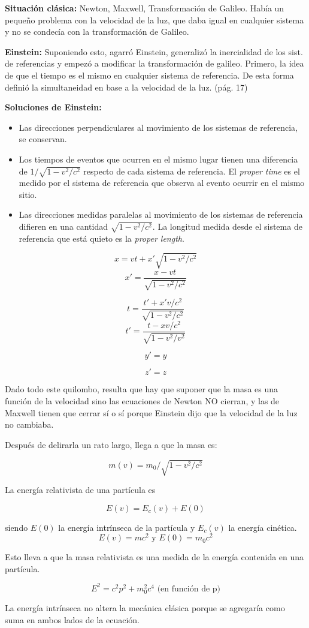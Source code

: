 \documentclass{article}
\begin{document}
\textbf{Situación clásica:}
Newton, Maxwell, Transformación de Galileo. Había un pequeño problema con la velocidad de la luz, que daba igual en cualquier sistema y no se condecía con la transformación de Galileo.

\textbf{Einstein:}
Suponiendo esto, agarró Einstein, generalizó la inercialidad de los sist. de referencias y empezó a modificar la transformación de galileo.
Primero, la idea de que el tiempo es el mismo en cualquier sistema de referencia. De esta forma definió la simultaneidad en base a la velocidad de la luz. (pág. 17)

\textbf{Soluciones de Einstein:}
\begin{itemize}
\item Las direcciones perpendiculares al movimiento de los sistemas de referencia, se conservan.
\item Los tiempos de eventos que ocurren en el mismo lugar tienen una diferencia de $1/\sqrt{1-v^{2}/c^{2}}$ respecto de cada sistema de referencia. El \emph{proper time} es el medido por el sistema de referencia que observa al evento ocurrir en el mismo sitio.
\item Las direcciones medidas paralelas al movimiento de los sistemas de referencia difieren en una cantidad $\sqrt{1-v^{2}/c^{2}}$. La longitud medida desde el sistema de referencia que está quieto es la \emph{proper length}.
\end{itemize}

\[ x = vt + x' \sqrt{1-v^{2}/c^{2}} \]
\[ x' = \frac{x-vt}{\sqrt{1-v^{2}/c^{2}}} \]

\[ t =  \frac{t'+x' v/c^{2}}{\sqrt{1-v^{2}/c^{2}}} \]
\[ t' = \frac{t-xv/c^{2}}{\sqrt{1-v^{2}/v^{2}}} \]

\[ y' =y \] 

\[ z' =z \]

Dado todo este quilombo, resulta que hay que suponer que la masa es una función de la velocidad sino las ecuaciones de Newton NO cierran, y las de Maxwell tienen que cerrar sí o sí porque Einstein dijo que la velocidad de la luz no cambiaba.

Después de delirarla un rato largo, llega a que la masa es:

\[ m(v) = m_{0}/\sqrt{1-v^{2}/c^{2}} \]

La energía relativista de una partícula es

\[ E(v) = E_{c} (v) + E (0) \]

siendo $E(0)$ la energía intrínseca de la partícula y $E_{c}(v)$ la energía cinética.
\[ E(v) = mc^{2} \textrm{ y } E(0) = m_{0}c^{2} \]

Esto lleva a que la masa relativista es una medida de la energía contenida en una partícula.

\[ E^{2} = c^{2}p^{2} + m_{0}^{2}c^{4} \textrm{ (en función de p)} \]

La energía intrínseca no altera la mecánica clásica porque se agregaría como suma en ambos lados de la ecuación.
\end{document}
